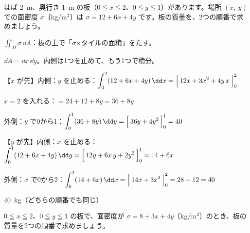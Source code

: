 \begin{reidai}[厚さがちがう板の重さ]
はば \qty{2}{m}、奥行き \qty{1}{m} の板（$0\leqq x\leqq2$、$0\leqq y\leqq1$）があります。場所 $(x,\ y)$ での面密度 $\sigma$〔kg/m$^2$〕は $\sigma=12+6x+4y$ です。板の質量を、2つの順番で求めましょう。\par
\kangaekata {}\par
{}\enspace $\iint_D\sigma\,\dd A$：板の上で「$\sigma$×タイルの面積」をたす。\par
{}\enspace $\dd A=\dd x\,\dd y$。内側は1つを止めて、もう1つで積分。\par
\shiki\kviiigs{}\zw{} 【$x$ が先】内側：$y$ を止める：$\displaystyle \int_0^2(12+6x+4y)\,\dd x=\Bigl[\,12x+3x^2+4y\,x\,\Bigr]_0^2$\par
\kviiiga $x=2$ を入れる：$\displaystyle =24+12+8y=36+8y$\par
\kviiiga 外側：$y$ で0から1：$\displaystyle \int_0^1(36+8y)\,\dd y=\Bigl[\,36y+4y^2\,\Bigr]_0^1=40$\par
\kviiiga 【$y$ が先】内側：$x$ を止める：$\displaystyle \int_0^1(12+6x+4y)\,\dd y=\Bigl[\,12y+6x\,y+2y^2\,\Bigr]_0^1=14+6x$\par
\kviiiga 外側：$x$ で0から2：$\displaystyle \int_0^2(14+6x)\,\dd x=\Bigl[\,14x+3x^2\,\Bigr]_0^2=28+12=40$\par
\kotae \qty{40}{kg}（どちらの順番でも同じ）
\end{reidai}

\begin{jibun}
$0\leqq x\leqq2$、$0\leqq y\leqq1$ の板で、面密度が $\sigma=8+3x+4y$〔kg/m$^2$〕のとき、板の質量を2つの順番で求めましょう。
\end{jibun}

